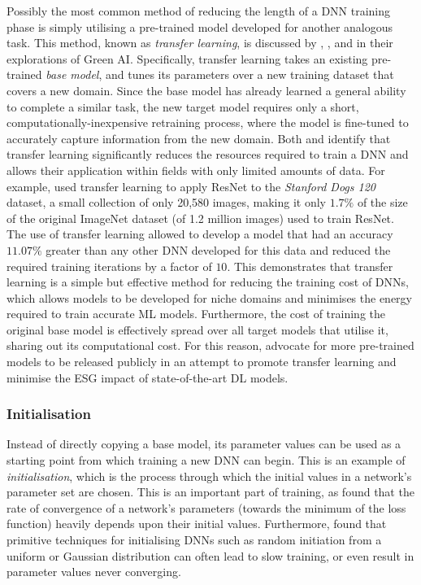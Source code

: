 \documentclass[a4paper, 11pt]{report}
\begin{document}
    Possibly the most common method of reducing the length of a DNN training phase is simply utilising a pre-trained model developed for another analogous task. This method, known as \emph{transfer learning}, is discussed by \citet{strubell-2019}, \citet{walsh-2021}, and \citet{schwartz-2019} in their explorations of Green AI. Specifically, transfer learning takes an existing pre-trained \emph{base model}, and tunes its parameters over a new training dataset that covers a new domain. Since the base model has already learned a general ability to complete a similar task, the new target model requires only a short, computationally-inexpensive retraining process, where the model is fine-tuned to accurately capture information from the new domain. Both \citet{strubell-2019} and \citet{walsh-2021} identify that transfer learning significantly reduces the resources required to train a DNN and allows their application within fields with only limited amounts of data. For example, \citet{wang-2020} used transfer learning to apply ResNet to the \emph{Stanford Dogs 120} dataset, a small collection of only 20,580 images, making it only $1.7\%$ of the size of the original ImageNet dataset (of 1.2 million images) used to train ResNet. The use of transfer learning allowed \citeauthor{wang-2020} to develop a model that had an accuracy $11.07\%$ greater than any other DNN developed for this data and reduced the required training iterations by a factor of $10$. This demonstrates that transfer learning is a simple but effective method for reducing the training cost of DNNs, which allows models to be developed for niche domains and minimises the energy required to train accurate ML models. Furthermore, the cost of training the original base model is effectively spread over all target models that utilise it, sharing out its computational cost. For this reason, \citet{schwartz-2019} advocate for more pre-trained models to be released publicly in an attempt to promote transfer learning and minimise the ESG impact of state-of-the-art DL models.


    \subsubsection{Initialisation}

    Instead of directly copying a base model, its parameter values can be used as a starting point from which training a new DNN can begin. This is an example of \emph{initialisation}, which is the process through which the initial values in a network's parameter set are chosen. This is an important part of training, as \citet{xu-2021} found that the rate of convergence of a network's parameters (towards the minimum of the loss function) heavily depends upon their initial values. Furthermore, \citet{hanin-2018} found that primitive techniques for initialising DNNs such as random initiation from a uniform or Gaussian distribution can often lead to slow training, or even result in parameter values never converging.
\end{document}
